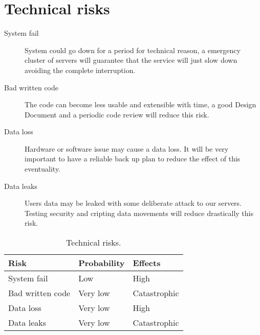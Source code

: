 \section{Technical risks}

\begin{description}

    \item[System fail] System could go down for a period for technical reason, a emergency cluster of servers will guarantee that the service will just slow down avoiding the complete interruption.

    \item[Bad written code] The code can become less usable and extensible with time, a good Design Document and a periodic code review will reduce this risk.

    \item[Data loss] Hardware or software issue may cause a data loss. It will be very important to have a reliable back up plan to reduce the effect of this eventuality.

    \item[Data leaks] Users data may be leaked with some deliberate attack to our servers. Testing security and cripting data movements will reduce drastically this risk.

\end{description}

\begin{table}[p]
\centering
    \begin{tabular}{| l | l | l |}
        \hline
        \textbf{Risk}                   & \textbf{Probability}  & \textbf{Effects}  \\
        \hline
        System fail                        & Low              & High              \\  
        \hline
        Bad written code                  & Very low                   & Catastrophic          \\
        \hline
        Data loss                       & Very low                   & High      \\
        \hline
        Data leaks                      & Very low              & Catastrophic      \\
        \hline
    \end{tabular}
    \caption{Technical risks.}
    \label{tab:technical-risks}
\end{table}